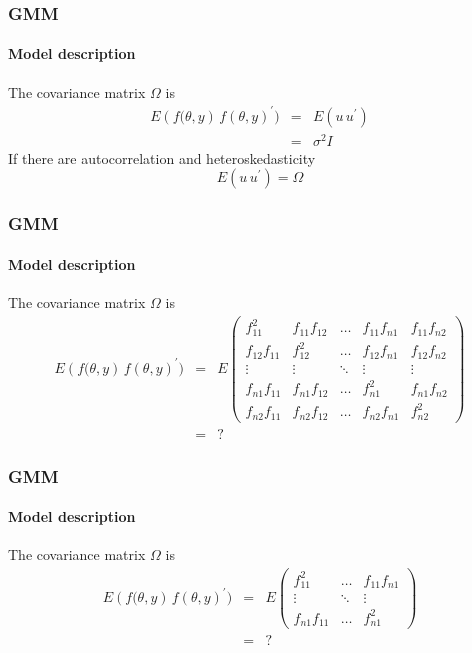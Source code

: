 \documentclass{beamer}
\begin{document}
\begin{frame}\frametitle{GMM}\framesubtitle{Model description}
\begin{example}
    The covariance matrix $\Omega $ is
    \begin{eqnarray*}
    E\left( f(\theta ,y\right) \,f\left( \theta ,y\right) ^{\prime }) &=&E\left(u\,u^{\prime }\right) \\
     &=&\sigma ^{2}I
    \end{eqnarray*}
    If there are autocorrelation and heteroskedasticity
    \begin{equation*}
    E\left( u\,u^{\prime }\right) =\Omega
    \end{equation*}
    \end{example}
\end{frame}


\begin{frame}\frametitle{GMM}\framesubtitle{Model description}
\begin{example}
    The covariance matrix $\Omega $ is
    \begin{eqnarray*}
    E\left( f(\theta ,y\right) \,f\left( \theta ,y\right) ^{\prime }) &=&E\left(
    \begin{array}{ccccc}
    f_{11}^{2} & f_{11}f_{12} & \ldots & f_{11}f_{n1} & f_{11}f_{n2} \\
    f_{12}f_{11} & f_{12}^{2} & \ldots & f_{12}f_{n1} & f_{12}f_{n2} \\
    \vdots & \vdots & \ddots & \vdots & \vdots \\
    f_{n1}f_{11} & f_{n1}f_{12} & \ldots & f_{n1}^{2} & f_{n1}f_{n2} \\
    f_{n2}f_{11} & f_{n2}f_{12} & \ldots & f_{n2}f_{n1} & f_{n2}^{2}
    \end{array}
    \right) \\
    &=&?
    \end{eqnarray*}
\end{example}
\end{frame}


\begin{frame}\frametitle{GMM}\framesubtitle{Model description}
\begin{example}
    The covariance matrix $\Omega $ is
    \begin{eqnarray*}
    E\left( f(\theta ,y\right) \,f\left( \theta ,y\right) ^{\prime }) &=&E\left(
    \begin{array}{ccc}
    f_{11}^{2} & \ldots & f_{11}f_{n1} \\
    \vdots & \ddots & \vdots \\
    f_{n1}f_{11} & \ldots & f_{n1}^{2}%
    \end{array}%
    \right) \\
    &=&?
    \end{eqnarray*}
\end{example}
\end{frame}
\end{document}
